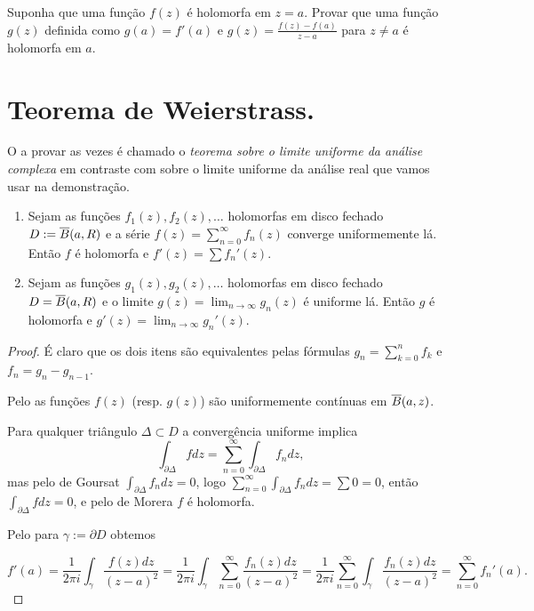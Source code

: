 \begin{problema}
\label{p:divide-holo}
Suponha que uma função $f(z)$ é holomorfa em $z=a$.
Provar que uma função $g(z)$ definida como $g(a) = f'(a)$
e $g(z) = \frac{f(z)-f(a)}{z-a}$ para $z\ne a$ é holomorfa em $a$.
\end{problema}

\section{Teorema de Weierstrass.}


O  a provar as vezes é chamado
o \emph{teorema sobre o limite uniforme da análise complexa}
em contraste com  sobre o limite uniforme da análise real
que vamos usar na demonstração.

\begin{lema}
\label{l:uniforme}
\begin{enumerate}
\item
Sejam as funções $f_1(z),f_2(z),\dots$ holomorfas em disco fechado
$D := \overline{B}(a,R)$ e a série $f(z) = \sum_{n=0}^\infty f_n(z)$ converge uniformemente lá.
Então $f$ é holomorfa e $f'(z) = \sum f_n'(z)$.
\item
Sejam as funções $g_1(z),g_2(z),\dots$ holomorfas em disco fechado
$D = \overline{B}(a,R)$ e o limite $g(z) = \lim_{n\to\infty} g_n(z)$ é uniforme lá.
Então $g$ é holomorfa e $g'(z) = \lim_{n\to\infty} g_n'(z)$.
\end{enumerate}
\end{lema}
\begin{proof}
É claro que os dois itens são equivalentes pelas fórmulas
$g_n = \sum_{k=0}^n f_k$ e $f_n = g_n - g_{n-1}$.

Pelo 
as funções $f(z)$ (resp. $g(z)$) são uniformemente contínuas em $\overline{B}(a,z)$.

Para qualquer triângulo $\Delta \subset D$ a convergência uniforme implica
\[ \int_{\partial \Delta} f dz = \sum_{n=0}^\infty \int_{\partial \Delta} f_n dz, \]
mas pelo  de Goursat $\int_{\partial \Delta} f_n dz = 0$,
logo $\sum_{n=0}^\infty \int_{\partial \Delta} f_n dz = \sum 0 = 0$,
então $\int_{\partial \Delta} f dz = 0$,
e pelo  de Morera $f$ é holomorfa.

Pelo  para $\gamma := \partial D$ obtemos

\[ f'(a) = \frac1{2\pi i} \int_{\gamma} \frac{f(z)dz}{(z-a)^2}
= \frac1{2\pi i} \int_{\gamma} \sum_{n=0}^\infty \frac{f_n(z)dz}{(z-a)^2}
= \frac1{2\pi i} \sum_{n=0}^\infty \int_{\gamma} \frac{f_n(z)dz}{(z-a)^2}
= \sum_{n=0}^\infty f_n'(a). \]
\end{proof}

